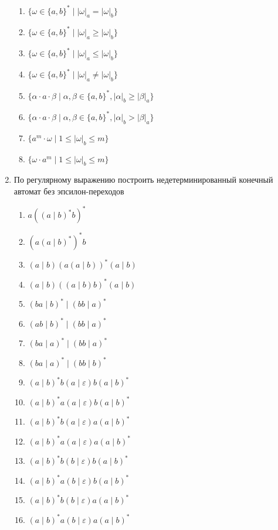 \documentclass[12pt]{article}
\begin{document}
\begin{enumerate}
\begin{enumerate}[label=\arabic*)]
    \item $\{\omega \in \{a, b\}^* \mid |\omega|_a = |\omega|_b\}$
    \item $\{\omega \in \{a, b\}^* \mid |\omega|_a \geq |\omega|_b\}$
    \item $\{\omega \in \{a, b\}^* \mid |\omega|_a \leq |\omega|_b\}$
    \item $\{\omega \in \{a, b\}^* \mid |\omega|_a \neq |\omega|_b\}$
    \item $\{\alpha \cdot a \cdot \beta \mid \alpha, \beta \in \{a, b\}^*, |\alpha|_b \geq |\beta|_a \}$
    \item $\{\alpha \cdot a \cdot \beta \mid \alpha, \beta \in \{a, b\}^*, |\alpha|_b > |\beta|_a \}$
    \item $\{a^m \cdot \omega \mid 1 \leq |\omega|_b \leq m\}$
    \item $\{\omega \cdot a^m  \mid 1 \leq |\omega|_b \leq m\}$
  \end{enumerate}

  \item По регулярному выражению построить недетерминированный конечный автомат без эпсилон-переходов
  \begin{enumerate}[label=\arabic*)]
    \setlength\itemsep{0.8em}

    \item $a ((a \mid b)^* b)^* $
    \item $(a (a \mid b)^*)^* b $
    \item $(a \mid b) (a (a \mid b))^* (a \mid b) $
    \item $(a \mid b) ((a \mid b) b)^* (a \mid b) $
    \item $(ba \mid b)^* \mid (bb \mid a)^*$
    \item $(ab \mid b)^* \mid (bb \mid a)^*$
    \item $(ba \mid a)^* \mid (bb \mid a)^*$
    \item $(ba \mid a)^* \mid (bb \mid b)^*$
    \item $(a \mid b)^* b (a \mid \varepsilon) b (a \mid b)^*$
    \item $(a \mid b)^* a (a \mid \varepsilon) b (a \mid b)^*$
    \item $(a \mid b)^* b (a \mid \varepsilon) a (a \mid b)^*$
    \item $(a \mid b)^* a (a \mid \varepsilon) a (a \mid b)^*$
    \item $(a \mid b)^* b (b \mid \varepsilon) b (a \mid b)^*$
    \item $(a \mid b)^* a (b \mid \varepsilon) b (a \mid b)^*$
    \item $(a \mid b)^* b (b \mid \varepsilon) a (a \mid b)^*$
    \item $(a \mid b)^* a (b \mid \varepsilon) a (a \mid b)^*$
  \end{enumerate}
\end{enumerate}
\end{document}
